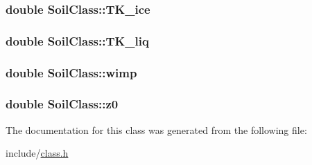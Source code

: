 \subsubsection[{\texorpdfstring{T\+K\+\_\+ice}{TK_ice}}]{\setlength{\rightskip}{0pt plus 5cm}double Soil\+Class\+::\+T\+K\+\_\+ice}\hypertarget{class_soil_class_ae6d499271031f749a8c150b3c2e1b5ab}{}\label{class_soil_class_ae6d499271031f749a8c150b3c2e1b5ab}
\subsubsection[{\texorpdfstring{T\+K\+\_\+liq}{TK_liq}}]{\setlength{\rightskip}{0pt plus 5cm}double Soil\+Class\+::\+T\+K\+\_\+liq}\hypertarget{class_soil_class_a4d89a6cb717b11f45a9e6c8b5390d160}{}\label{class_soil_class_a4d89a6cb717b11f45a9e6c8b5390d160}
\subsubsection[{\texorpdfstring{wimp}{wimp}}]{\setlength{\rightskip}{0pt plus 5cm}double Soil\+Class\+::wimp}\hypertarget{class_soil_class_a493cd824eaaf70a8ba3d21f2957c5705}{}\label{class_soil_class_a493cd824eaaf70a8ba3d21f2957c5705}
\subsubsection[{\texorpdfstring{z0}{z0}}]{\setlength{\rightskip}{0pt plus 5cm}double Soil\+Class\+::z0}\hypertarget{class_soil_class_affec2cb4274ce8cda22fdda7700ef6d9}{}\label{class_soil_class_affec2cb4274ce8cda22fdda7700ef6d9}


The documentation for this class was generated from the following file\+:\begin{DoxyCompactItemize}
\item 
include/\hyperlink{class_8h}{class.\+h}\end{DoxyCompactItemize}
